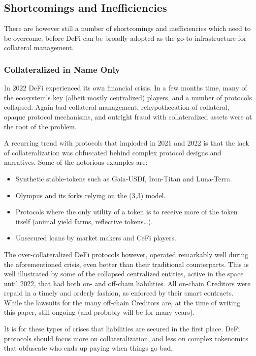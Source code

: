 \documentclass[sigconf,nonacm]{acmart}
\begin{document}
\subsection{Shortcomings and Inefficiencies}
\label{subsec:shortcomings-and-inefficiencies}

There are however still a number of shortcomings and inefficiencies which need to be overcome,
before DeFi can be broadly adopted as the go-to infrastructure for collateral management.

\subsubsection{Collateralized in Name Only}
In 2022 DeFi experienced its own financial crisis.
In a few months time, many of the ecosystem's key (albeit mostly centralized) players, and a number of protocols collapsed.
Again bad collateral management, rehypothecation of collateral, opaque protocol mechanisms,
and outright fraud with collateralized assets were at the root of the problem.

A recurring trend with protocols that imploded in 2021 and 2022 is that the lack of collateralization was obfuscated behind complex protocol designs and narratives. 
Some of the notorious examples are:
\begin{itemize}
    \item Synthetic stable-tokens such as Gaia-USDf, Iron-Titan and Luna-Terra.
    \item Olympus and its forks relying on the (3,3) model.
    \item Protocols where the only utility of a token is to receive more of the token itself (animal yield farms, reflective tokens…).
    \item Unsecured loans by market makers and CeFi players.
\end{itemize}

The over-collateralized DeFi protocols however, operated remarkably well during the aforementioned crisis, even better than their traditional counterparts.
This is well illustrated by some of the collapsed centralized entities, active in the space until 2022, that had both on- and off-chain liabilities.
All on-chain Creditors were repaid in a timely and orderly fashion, as enforced by their smart contracts.
While the lawsuits for the many off-chain Creditors are, at the time of writing this paper, still ongoing (and probably will be for many years).

It is for these types of crises that liabilities are secured in the first place.
DeFi protocols should focus more on collateralization, and less on complex tokenomics that obfuscate who ends up paying when things go bad.
\end{document}
